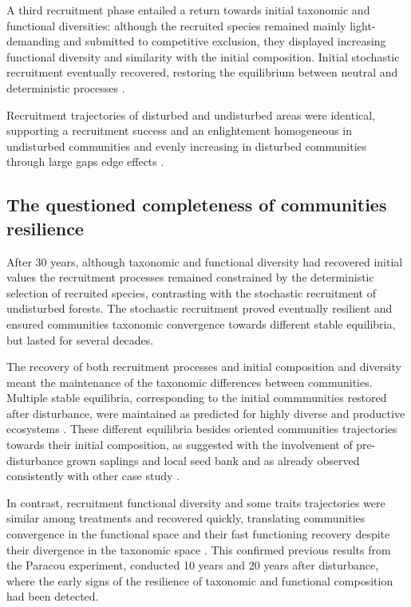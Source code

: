 \documentclass[fleqn,10pt]{ArtEcoFoG} %
\begin{document}
A third recruitment phase entailed a return towards initial taxonomic
and functional diversities: although the recruited species remained
mainly light-demanding and submitted to competitive exclusion, they
displayed increasing functional diversity and similarity with the
initial composition. Initial stochastic recruitment eventually
recovered, restoring the equilibrium between neutral and deterministic
processes \citep{Lawton1988, Chave2004, Mayfield2010}.

Recruitment trajectories of disturbed and undisturbed areas were
identical, supporting a recruitment success and an enlightement
homogeneous in undisturbed communities \citep{Dalling2002} and evenly
increasing in disturbed communities through large gaps edge effects
\citep{Ruger2009}.

\subsection{The questioned completeness of communities
resilience}\label{the-questioned-completeness-of-communities-resilience}

After 30 years, although taxonomic and functional diversity had
recovered initial values the recruitment processes remained constrained
by the deterministic selection of recruited species, contrasting with
the stochastic recruitment of undisturbed forests. The stochastic
recruitment proved eventually resilient and ensured communities
taxonomic convergence towards different stable equilibria, but lasted
for several decades.

The recovery of both recruitment processes and initial composition and
diversity meant the maintenance of the taxonomic differences between
communities. Multiple stable equilibria, corresponding to the initial
commmunities restored after disturbance, were maintained as predicted
for highly diverse and productive ecosystems \citep{Chase2003}. These
different equilibria besides oriented communities trajectories towards
their initial composition, as suggested with the involvement of
pre-disturbance grown saplings and local seed bank and as already
observed consistently with other case study
\citep{Dalling2002, Anderson2007}.

In contrast, recruitment functional diversity and some traits
trajectories were similar among treatments and recovered quickly,
translating communities convergence in the functional space and their
fast functioning recovery despite their divergence in the taxonomic
space \citep{Fukami2005}. This confirmed previous results from the
Paracou experiment, conducted 10 years \citep{Molino2001} and 20 years
\citep{Baraloto2012a} after disturbance, where the early signs of the
resilience of taxonomic and functional composition had been detected.
\end{document}
